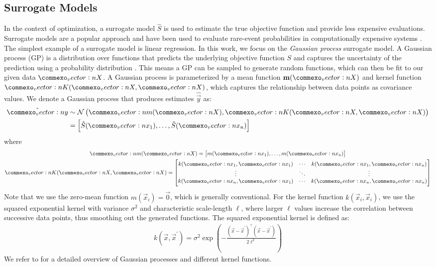 \subsection{Surrogate Models}
In the context of optimization, a surrogate model $\hat{S}$ is used to estimate the true objective function and provide less expensive evaluations.
Surrogate models are a popular approach and have been used to evaluate rare-event probabilities in computationally expensive systems \cite{li2010evaluation,li2011efficient}.
The simplest example of a surrogate model is linear regression.
In this work, we focus on the \textit{Gaussian process} surrogate model.
A Gaussian process (GP) is a distribution over functions that predicts the underlying objective function $S$ and captures the uncertainty of the prediction using a probability distribution \cite{kochenderfer2019algorithms}.
This means a GP can be sampled to generate random functions, which can then be fit to our given data $\mat{X}$.
A Gaussian process is parameterized by a mean function $\m(\mat{X})$ and kernel function $\mat{K}(\mat{X},\mat{X})$, which captures the relationship between data points as covariance values.
We denote a Gaussian process that produces estimates $\hat{\vec{y}}$ as:
\begin{align*}
\hat{\vec{y}} &\sim\mathcal{N}\left(\vec{m}(\mat{X}),\vec{K}(\mat{X},\mat{X})\right)\\
        &= \begin{bmatrix} %
            \hat{S}(\vec{x}_1), \ldots, \hat{S}(\vec{x}_n)
        \end{bmatrix}
\end{align*}
where
\begin{gather*}
\vec{m}(\mat{X}) = \begin{bmatrix} m(\vec{x}_1), \ldots, m(\vec{x}_n) \end{bmatrix}\\
\vec{K}(\mat{X}, \mat{X}) = \begin{bmatrix}
         k(\vec{x}_1, \vec{x}_1) & \cdots & k(\vec{x}_1, \vec{x}_n)\\
         \vdots & \ddots & \vdots\\
         k(\vec{x}_n, \vec{x}_1) & \cdots & k(\vec{x}_n, \vec{x}_n)
     \end{bmatrix}
\end{gather*}
Note that we use the zero-mean function $m(\vec{x}_i) = \vec{0}$, which is generally conventional.
For the kernel function $k(\vec{x}_i, \vec{x}_i)$, we use the squared exponential kernel with variance $\sigma^2$ and characteristic scale-length $\ell$, where larger $\ell$ values increase the correlation between successive data points, thus smoothing out the generated functions. The squared exponential kernel is defined as:
\begin{align*}
k(\vec{x},\vec{x}^\prime) = \sigma^2\exp\left(- \frac{(\vec{x} - \vec{x}^\prime)^\top(\vec{x} - \vec{x}^\prime)}{2\ell^2}\right)
\end{align*}
We refer to \cite{kochenderfer2019algorithms} for a detailed overview of Gaussian processes and different kernel functions.



